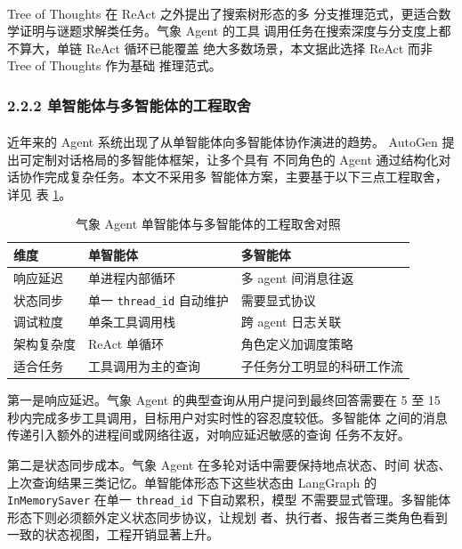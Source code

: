 \documentclass[a4paper]{article}
\newcommand{\song}{\CJKfamily{song}}
\theoremstyle{definition}
\theoremstyle{plain}
\theoremstyle{remark}
\newcommand{\reftab}[1]{表 \ref{#1}}
\let\oldcite\cite
\renewcommand{\cite}[1]{\textsuperscript{\oldcite{#1}}}
\newcommand{\bk}{\discretionary{}{}{}}
\begin{document}
Tree of Thoughts \cite{ref30} 在 ReAct 之外提出了搜索树形态的多
分支推理范式，更适合数学证明与谜题求解类任务。气象 Agent 的工具
调用任务在搜索深度与分支度上都不算大，单链 ReAct 循环已能覆盖
绝大多数场景，本文据此选择 ReAct 而非 Tree of Thoughts 作为基础
推理范式。

\subsubsection*{2.2.2 \quad 单智能体与多智能体的工程取舍}

近年来的 Agent 系统出现了从单智能体向多智能体协作演进的趋势。
AutoGen \cite{ref19} 提出可定制对话格局的多智能体框架，让多个具有
不同角色的 Agent 通过结构化对话协作完成复杂任务。本文不采用多
智能体方案，主要基于以下三点工程取舍，详见
\reftab{tab:single-vs-multi-agent}。

\begin{table}[!ht]
    \centering
    \caption{气象 Agent 单智能体与多智能体的工程取舍对照}
    \label{tab:single-vs-multi-agent}
    \song\fontsize{9pt}{12pt}\selectfont
    \renewcommand{\arraystretch}{0.95}
    \begin{tabular}{lll}
        \toprule
        维度 & 单智能体 & 多智能体 \\
        \midrule
        响应延迟 & 单进程内部循环 & 多 agent 间消息往返 \\
        状态同步 & 单一 \texttt{thread\_\bk{}id} 自动维护 & 需要显式协议 \\
        调试粒度 & 单条工具调用栈 & 跨 agent 日志关联 \\
        架构复杂度 & ReAct 单循环 & 角色定义加调度策略 \\
        适合任务 & 工具调用为主的查询 & 子任务分工明显的科研工作流 \\
        \bottomrule
    \end{tabular}
\end{table}

第一是响应延迟。气象 Agent 的典型查询从用户提问到最终回答需要在 5 至
15 秒内完成多步工具调用，目标用户对实时性的容忍度较低。多智能体
之间的消息传递引入额外的进程间或网络往返，对响应延迟敏感的查询
任务不友好。

第二是状态同步成本。气象 Agent 在多轮对话中需要保持地点状态、时间
状态、上次查询结果三类记忆。单智能体形态下这些状态由 LangGraph 的
\texttt{InMemorySaver} 在单一 \texttt{thread\_\bk{}id} 下自动累积，模型
不需要显式管理。多智能体形态下则必须额外定义状态同步协议，让规划
者、执行者、报告者三类角色看到一致的状态视图，工程开销显著上升。
\end{document}
